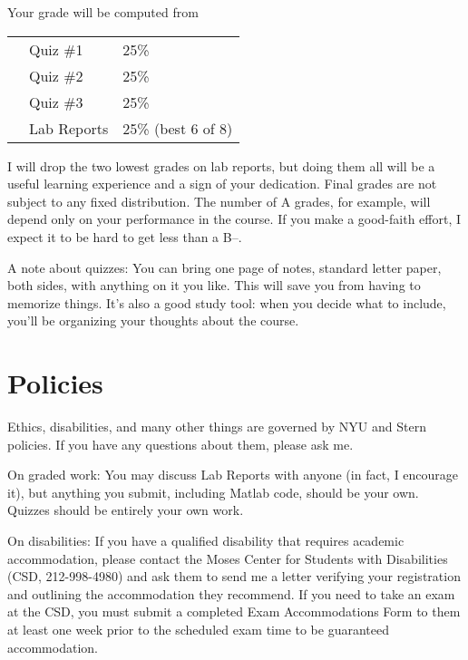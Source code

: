 \documentclass[11pt]{article}
\begin{document}
Your grade will be computed from
\begin{center}
\begin{tabular}{lll}
&Quiz \#1    &   25\% \\
&Quiz \#2    &   25\% \\
&Quiz \#3    &   25\% \\
\hspace*{0.2in}&Lab Reports  \hspace*{0.25in}    &   25\%  (best 6 of 8)
\end{tabular}
\end{center}
I will drop the two lowest grades on lab reports,
but doing them all will be a useful learning experience
and a sign of your dedication.
Final grades are not subject to any fixed distribution.
The number of A grades, for example,
will depend only on your performance in the course.
If you make a good-faith effort,
I expect it to be hard to get less than a B--.

A note about quizzes:  You can bring one page of notes, standard letter paper,
both sides, with anything on it you like.
This will save you from having to memorize things.
It's also a good study tool:  when you decide what to include,
you'll be organizing your thoughts about the course.


\section*{Policies}

Ethics, disabilities, and many other things are governed by NYU
and Stern policies.
If you have any questions about them, please ask me.

On graded work:
You may discuss Lab Reports with anyone (in fact, I encourage it),
but anything you submit, including Matlab code, should be your own.
Quizzes should be entirely your own work.

On disabilities:
If you have a qualified disability that requires academic accommodation,
please contact the Moses Center for Students with Disabilities (CSD, 212-998-4980) and ask them to
send me a letter verifying your registration and outlining the accommodation they recommend.
If you need to take an exam at the CSD,
you must submit a completed Exam Accommodations Form to them
at least one week prior to the scheduled exam time to be guaranteed accommodation.
\end{document}
